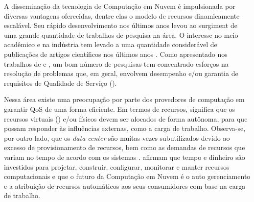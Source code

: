 \setcounter{page}{1}


A disseminação da tecnologia de Computação em Nuvem é impulsionada por diversas vantagens oferecidas, dentre elas o modelo de recursos dinamicamente escalável. Seu rápido desenvolvimento nos últimos anos levou ao surgiment de uma grande quantidade de trabalhos de pesquisa na área. O interesse no meio acadêmico e na indústria tem levado a uma quantidade considerável de publicações de artigos científicos nos últimos anos \cite{Heilig2014}. Como apresentado nos trabalhos de  e , um bom número de pesquisas tem concentrado esforços na resolução de problemas que, em geral, envolvem desempenho e/ou garantia de requisitos de Qualidade de Serviço (\textit{}). 

Nessa área existe uma preocupação por parte dos provedores de computação em garantir QoS de uma forma eficiente. Em termos de recursos, significa que os recursos virtuais (\textit{}) e/ou físicos devem ser alocados de forma autônoma, para que possam responder às influências externas, como a carga de trabalho. Observa-se, por outro lado, que os \textit{data center} são muitas vezes subutilizados devido ao excesso de provisionamento de recursos, bem como as demandas de recursos que variam no tempo de acordo com os sistemas \cite{Padala2007}.  afirmam que tempo e dinheiro são investidos para projetar, construir, configurar, monitorar e manter recursos computacionais e que o futuro da Computação em Nuvem é o auto gerenciamento e a atribuição de recursos automáticos aos seus consumidores com base na carga de trabalho.

